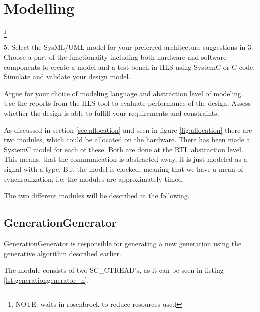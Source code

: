 \section{Modelling}
\footnote{\color{red}NOTE: waits in rosenbrock to reduce resources used}

\begin{framed}
5. Select the SysML/UML model for your preferred architecture suggestions in 3. Choose a part of the functionality including both hardware and software components to create a model and a test-bench in HLS using SystemC or C-code. Simulate and validate your design model.

Argue for your choice of modeling language and abstraction level of modeling. Use the reports from the HLS tool to evaluate performance of the design. Assess whether the design is able to fulfill your requirements and constraints.
\end{framed}

As discussed in section \ref{sec:allocation} and seen in figure \ref{fig:allocation} there are two modules, which could be allocated on the hardware. There has been made a SystemC model for each of these. Both are done at the RTL abstraction level. This means, that the communication is abstracted away, it is just modeled as a signal with a type. But the model is clocked, meaning that we have a mean of synchronization, i.e. the modules are approximately timed.

The two different modules will be described in the following.

\subsection{GenerationGenerator}
GenerationGenerator is responsible for generating a new generation using the generative algorithm described earlier.

The module consists of two SC\_CTREAD's, as it can be seen in listing \ref{lst:generationgenerator_h}.

